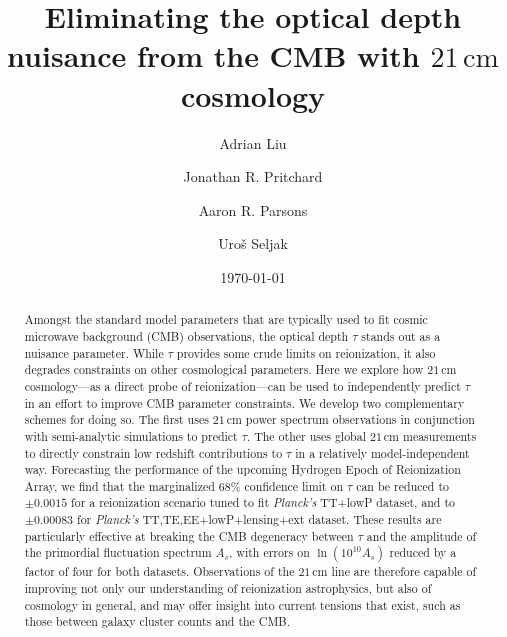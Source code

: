 \documentclass[twocolumn,aps,prd,nofootinbib,showpacs]{revtex4-1}
\begin{document}
\title{Eliminating the optical depth nuisance from the CMB with $21\,\textrm{cm}$ cosmology}


\author{Adrian Liu}

\author{Jonathan R. Pritchard}

\author{Aaron R. Parsons}

\author{Uro\v{s} Seljak}

\date{\today}





\begin{abstract}
Amongst the standard model parameters that are typically used to fit cosmic microwave background (CMB) observations, the optical depth $\tau$ stands out as a nuisance parameter. While $\tau$ provides some crude limits on reionization, it also degrades constraints on other cosmological parameters. Here we explore how $21\,\textrm{cm}$ cosmology---as a direct probe of reionization---can be used to independently predict $\tau$ in an effort to improve CMB parameter constraints. We develop two complementary schemes for doing so. The first uses $21\,\textrm{cm}$ power spectrum observations in conjunction with semi-analytic simulations to predict $\tau$. The other uses global $21\,\textrm{cm}$ measurements to directly constrain low redshift contributions to $\tau$ in a relatively model-independent way. Forecasting the performance of the upcoming Hydrogen Epoch of Reionization Array, we find that the marginalized $68\%$ confidence limit on $\tau$ can be reduced to $\pm 0.0015$ for a reionization scenario tuned to fit \emph{Planck's} TT+lowP dataset, and to $\pm 0.00083$ for \emph{Planck's} TT,TE,EE+lowP+lensing+ext dataset. These results are particularly effective at breaking the CMB degeneracy between $\tau$ and the amplitude of the primordial fluctuation spectrum $A_s$, with errors on $\ln (10^{10} A_s)$ reduced by a factor of four for both datasets. Observations of the $21\,\textrm{cm}$ line are therefore capable of improving not only our understanding of reionization astrophysics, but also of cosmology in general, and may offer insight into current tensions that exist, such as those between galaxy cluster counts and the CMB.
\end{abstract}
\end{document}
